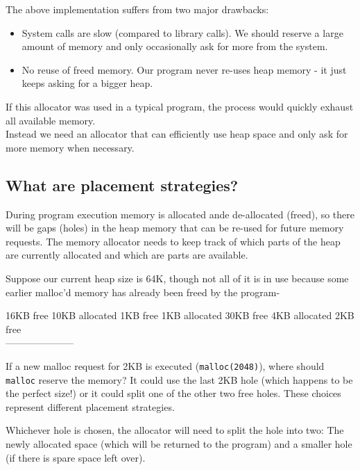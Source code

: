 The above implementation suffers from two major drawbacks:

\begin{itemize}
\itemsep1pt\parskip0pt
\item
  System calls are slow (compared to library calls). We should reserve a
  large amount of memory and only occasionally ask for more from the
  system.
\item
  No reuse of freed memory. Our program never re-uses heap memory - it
  just keeps asking for a bigger heap.
\end{itemize}

If this allocator was used in a typical program, the process would
quickly exhaust all available memory.\\Instead we need an allocator that
can efficiently use heap space and only ask for more memory when
necessary.

\subsection{What are placement
strategies?}\label{what-are-placement-strategies}

During program execution memory is allocated ande de-allocated (freed),
so there will be gaps (holes) in the heap memory that can be re-used for
future memory requests. The memory allocator needs to keep track of
which parts of the heap are currently allocated and which are parts are
available.

Suppose our current heap size is 64K, though not all of it is in use
because some earlier malloc'd memory has already been freed by the
program-

16KB free \textbar{} 10KB allocated \textbar{} 1KB free \textbar{} 1KB
allocated \textbar{} 30KB free \textbar{} 4KB allocated \textbar{} 2KB
free\\---\textbar{}---\textbar{}---\textbar{}---\textbar{}---\textbar{}---\textbar{}---

If a new malloc request for 2KB is executed (\texttt{malloc(2048)}),
where should \texttt{malloc} reserve the memory? It could use the last
2KB hole (which happens to be the perfect size!) or it could split one
of the other two free holes. These choices represent different placement
strategies.

Whichever hole is chosen, the allocator will need to split the hole into
two: The newly allocated space (which will be returned to the program)
and a smaller hole (if there is spare space left over).

